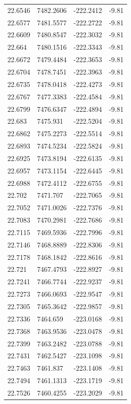 \begin{table}[H]
\begin{tabular}{llll}
22.6546 & 7482.2606 & -222.2412 & -9.81 \\
22.6577 & 7481.5577 & -222.2722 & -9.81 \\
22.6609 & 7480.8547 & -222.3032 & -9.81 \\
22.664 & 7480.1516 & -222.3343 & -9.81 \\
22.6672 & 7479.4484 & -222.3653 & -9.81 \\
22.6704 & 7478.7451 & -222.3963 & -9.81 \\
22.6735 & 7478.0418 & -222.4273 & -9.81 \\
22.6767 & 7477.3383 & -222.4584 & -9.81 \\
22.6799 & 7476.6347 & -222.4894 & -9.81 \\
22.683 & 7475.931 & -222.5204 & -9.81 \\
22.6862 & 7475.2273 & -222.5514 & -9.81 \\
22.6893 & 7474.5234 & -222.5824 & -9.81 \\
22.6925 & 7473.8194 & -222.6135 & -9.81 \\
22.6957 & 7473.1154 & -222.6445 & -9.81 \\
22.6988 & 7472.4112 & -222.6755 & -9.81 \\
22.702 & 7471.707 & -222.7065 & -9.81 \\
22.7052 & 7471.0026 & -222.7376 & -9.81 \\
22.7083 & 7470.2981 & -222.7686 & -9.81 \\
22.7115 & 7469.5936 & -222.7996 & -9.81 \\
22.7146 & 7468.8889 & -222.8306 & -9.81 \\
22.7178 & 7468.1842 & -222.8616 & -9.81 \\
22.721 & 7467.4793 & -222.8927 & -9.81 \\
22.7241 & 7466.7744 & -222.9237 & -9.81 \\
22.7273 & 7466.0693 & -222.9547 & -9.81 \\
22.7305 & 7465.3642 & -222.9857 & -9.81 \\
22.7336 & 7464.659 & -223.0168 & -9.81 \\
22.7368 & 7463.9536 & -223.0478 & -9.81 \\
22.7399 & 7463.2482 & -223.0788 & -9.81 \\
22.7431 & 7462.5427 & -223.1098 & -9.81 \\
22.7463 & 7461.837 & -223.1408 & -9.81 \\
22.7494 & 7461.1313 & -223.1719 & -9.81 \\
22.7526 & 7460.4255 & -223.2029 & -9.81 \\

\end{tabular}
\end{table}

